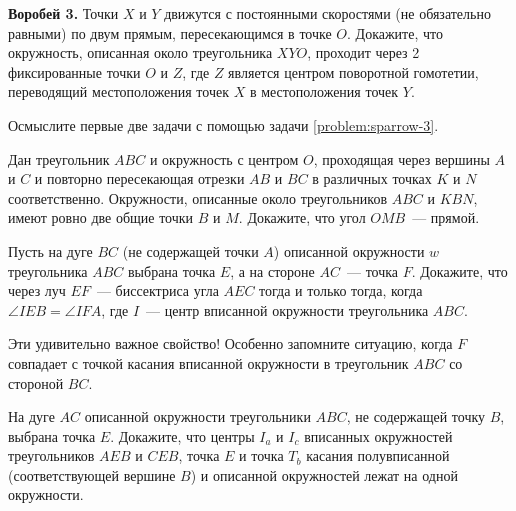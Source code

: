 \begin{problems}
\item\label{problem:sparrow-3}\textbf{Воробей 3.}
Точки $X$ и $Y$ движутся с постоянными скоростями (не обязательно равными)
по двум прямым, пересекающимся в точке $O$.
Докажите, что окружность, описанная около треугольника $XYO$, проходит через 2
фиксированные точки $O$ и $Z$, где $Z$ является центром поворотной гомотетии,
переводящий местоположения точек $X$ в местоположения точек $Y$.

\end{problems}

\observation
Осмыслите первые две задачи с помощью задачи \ref{problem:sparrow-3}.

\begin{problems}

\ifgroupten
\item
Дан треугольник $ABC$ и окружность с центром $O$, проходящая через вершины $A$
и $C$ и повторно пересекающая отрезки $AB$ и $BC$ в различных точках $K$ и $N$
соответственно.
Окружности, описанные около треугольников $ABC$ и $KBN$, имеют ровно две общие
точки $B$ и $M$.
Докажите, что угол $OMB$~--- прямой.
\fi

\item
Пусть на дуге $BC$ (не содержащей точки $A$) описанной окружности $w$
треугольника $ABC$ выбрана точка $E$, а на стороне $AC$~--- точка $F$.
Докажите, что через луч $EF$~--- биссектриса угла $AEC$ тогда и только тогда,
когда $\angle IEB = \angle IFA$, где $I$~--- центр вписанной окружности
треугольника $ABC$.

\end{problems}

\observation
Эти удивительно важное свойство!
Особенно запомните ситуацию, когда $F$ совпадает с точкой касания вписанной
окружности в треугольник $ABC$ со стороной $BC$.

\ifgroupeleven
\begin{problems}

\item
На дуге $AC$ описанной окружности треугольники $ABC$, не содержащей точку $B$,
выбрана точка $E$.
Докажите, что центры $I_a$ и $I_c$ вписанных окружностей треугольников $AEB$ и
$CEB$, точка $E$ и точка $T_b$ касания полувписанной
(соответствующей вершине $B$) и описанной окружностей лежат на одной
окружности.

\end{problems}
\fi

\endgroup%

